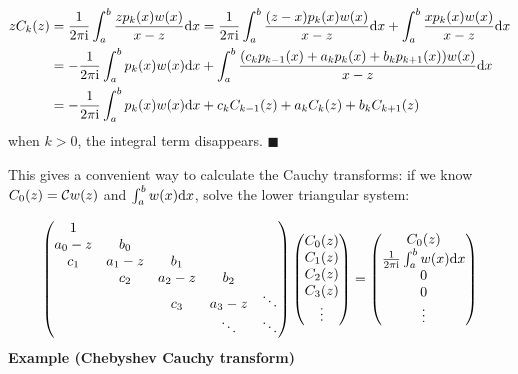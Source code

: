 \documentclass[12pt,landscape]{article}
\def\D{ {\rm d} }
\def\I{ {\rm i} }
\def\C{ {\mathbb C} }
\def\dx{\D x}
\begin{document}
{\begin{align*}
z C_k(z) &= {1 \over 2 \pi \I} \int_a^b {z p_k(x) w(x) \over x -z} \dx  = {1 \over 2 \pi \I} \int_a^b {(z -x) p_k(x) w(x) \over x -z} \dx  +  \int_a^b {x p_k(x) w(x) \over x -z} \dx \\
  &= -{1 \over 2 \pi \I} \int_a^b p_k(x) w(x)  \dx +  \int_a^b {(c_k p_{k-1}(x) + a_k p_k(x) + b_k p_{k+1}(x)) w(x) \over x -z} \dx \\
  &= -{1 \over 2 \pi \I} \int_a^b p_k(x) w(x)  \dx + c_k C_{k-1}(z) + a_k C_k(z) + b_k C_{k+1}(z)
\end{align*}
when $k > 0$, the integral term disappears. \ensuremath{\blacksquare}

This gives a convenient way to calculate the Cauchy transforms: if we know $C_0(z) ={\cal C}w(z)$ and $\int_a^b w(x) \dx$, solve the lower triangular system:

\[
\begin{pmatrix}
1 \\
a_0-z & b_0 \\
c_1 & a_1-z & b_1 \\
&c_2 & a_2-z & b_2 \\
&& c_3 & a_3-z &\ddots\\
&&&\ddots & \ddots
\end{pmatrix}\begin{pmatrix}C_0(z) \\C_1(z) \\C_2(z) \\C_3(z) \\ \vdots \end{pmatrix} = \begin{pmatrix}C_0(z) \\{1 \over 2 \pi \I} \int_a^b w(x) \dx \\0 \\0 \\ \vdots \end{pmatrix}
\]
\newpage
\textbf{Example (Chebyshev Cauchy transform)}

}
\end{document}
